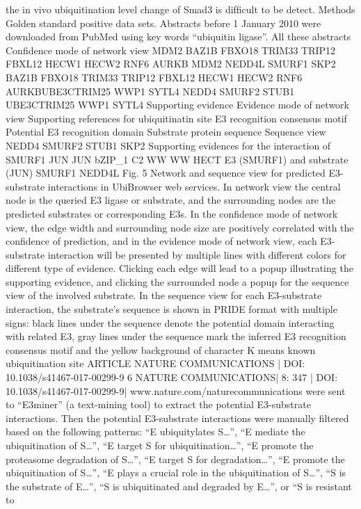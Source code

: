 the in vivo ubiquitination level change of Smad3 is difﬁcult to be
detect.
Methods
Golden standard positive data sets. Abstracts before 1 January 2010 were
downloaded from PubMed using key words “ubiquitin ligase”. All these abstracts
Confidence mode of network view
MDM2
BAZ1B
FBXO18
TRIM33
TRIP12
FBXL12
HECW1
HECW2
RNF6
AURKB
MDM2 NEDD4L
SMURF1
SKP2
BAZ1B
FBXO18
TRIM33
TRIP12
FBXL12
HECW1
HECW2
RNF6
AURKBUBE3CTRIM25
WWP1
SYTL4
NEDD4
SMURF2
STUB1
UBE3CTRIM25
WWP1
SYTL4
Supporting evidence
Evidence mode of network view
Supporting references for ubiquitinatin site
E3 recognition consensus motif
Potential E3 recognition domain
Substrate protein sequence
Sequence view
NEDD4
SMURF2
STUB1
SKP2
Supporting evidences for the interaction of
SMURF1
JUN
JUN
bZIP\_1
C2
WW
WW
HECT
E3 (SMURF1) and substrate (JUN)
SMURF1
NEDD4L
Fig. 5 Network and sequence view for predicted E3-substrate interactions in UbiBrowser web services. In network view the central node is the queried E3
ligase or substrate, and the surrounding nodes are the predicted substrates or corresponding E3s. In the conﬁdence mode of network view, the edge width
and surrounding node size are positively correlated with the conﬁdence of prediction, and in the evidence mode of network view, each E3-substrate
interaction will be presented by multiple lines with different colors for different type of evidence. Clicking each edge will lead to a popup illustrating the
supporting evidence, and clicking the surrounded node a popup for the sequence view of the involved substrate. In the sequence view for each E3-substrate
interaction, the substrate’s sequence is shown in PRIDE format with multiple signs: black lines under the sequence denote the potential domain interacting
with related E3, gray lines under the sequence mark the inferred E3 recognition consensus motif and the yellow background of character K means known
ubiquitination site
ARTICLE
NATURE COMMUNICATIONS | DOI: 10.1038/s41467-017-00299-9
6
NATURE COMMUNICATIONS| 8:  347
| DOI: 10.1038/s41467-017-00299-9| www.nature.com/naturecommunications
were sent to “E3miner” (a text-mining tool) to extract the potential E3-substrate
interactions. Then the potential E3-substrate interactions were manually ﬁltered
based on the following patterns: “E ubiquitylates S…”, “E mediate the
ubiquitination of S…”, “E target S for ubiquitination…”, “E promote the
proteasome degradation of S…”, “E target S for degradation…”, “E promote the
ubiquitination of S…”, “E plays a crucial role in the ubiquitination of S…”, “S is the
substrate of E…”, “S is ubiquitinated and degraded by E…”, or “S is resistant to

